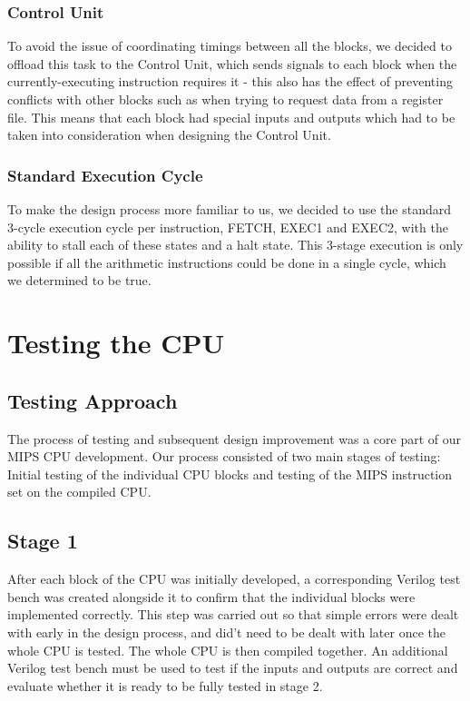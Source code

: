 \documentclass{article}
\begin{document}
\subsubsection{Control Unit}
To avoid the issue of coordinating timings between all the blocks, we decided to offload this task to the Control Unit, which sends signals to each block when the currently-executing instruction requires it - this also has the effect of preventing conflicts with other blocks such as when trying to request data from a register file. This means that each block had special inputs and outputs which had to be taken into consideration when designing the Control Unit.

\subsubsection{Standard Execution Cycle}
To make the design process more familiar to us, we decided to use the standard 3-cycle execution cycle per instruction, FETCH, EXEC1 and EXEC2, with the ability to stall each of these states and a halt state. This 3-stage execution is only possible if all the arithmetic instructions could be done in a single cycle, which we determined to be true.

\section{Testing the CPU}

\subsection{Testing Approach}

The process of testing and subsequent design improvement was a core part of our MIPS CPU development. Our process consisted of two main stages of testing: Initial testing of the individual CPU blocks and testing of the MIPS instruction set on the compiled CPU. 

\subsection{Stage 1}

After each block of the CPU was initially developed, a corresponding Verilog test bench was created alongside it to confirm that the individual blocks were implemented correctly. This step was carried out so that simple errors were dealt with early in the design process, and did’t need to be dealt with later once the whole CPU is tested. The whole CPU is then compiled together. An additional Verilog test bench must be used to test if the inputs and outputs are correct and evaluate whether it is ready to be fully tested in stage 2.
\end{document}
